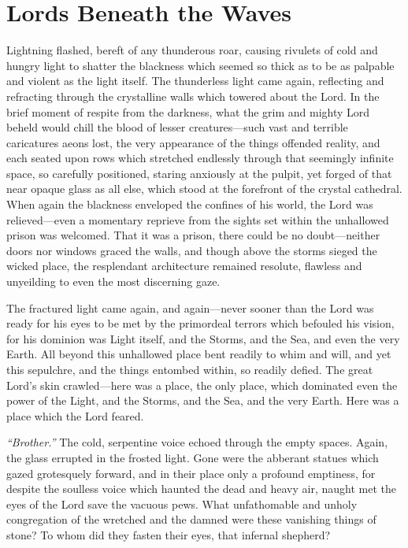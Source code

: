 \documentclass{report}
\begin{document}
\chapter*{Lords Beneath the Waves}

Lightning flashed, bereft of any thunderous roar, causing rivulets of cold and hungry light to shatter the blackness which seemed so thick as to be as palpable and violent as the light itself. The thunderless light came again, reflecting and refracting through the crystalline walls which towered about the Lord. In the brief moment of respite from the darkness, what the grim and mighty Lord beheld would chill the blood of lesser creatures—such vast and terrible caricatures aeons lost, the very appearance of the things offended reality, and each seated upon rows which stretched endlessly through that seemingly infinite space, so carefully positioned, staring anxiously at the pulpit, yet forged of that near opaque glass as all else, which stood at the forefront of the crystal cathedral. When again the blackness enveloped the confines of his world, the Lord was relieved—even a momentary reprieve from the sights set within the unhallowed prison was welcomed. That it was a prison, there could be no doubt—neither doors nor windows graced the walls, and though above the storms sieged the wicked place, the resplendant architecture remained resolute, flawless and unyeilding to even the most discerning gaze.

The fractured light came again, and again—never sooner than the Lord was ready for his eyes to be met by the primordeal terrors which befouled his vision, for his dominion was Light itself, and the Storms, and the Sea, and even the very Earth. All beyond this unhallowed place bent readily to whim and will, and yet this sepulchre, and the things entombed within, so readily defied. The great Lord's skin crawled—here was a place, the only place, which dominated even the power of the Light, and the Storms, and the Sea, and the very Earth. Here was a place which the Lord feared.

\textit{``Brother.''} The cold, serpentine voice echoed through the empty spaces. Again, the glass errupted in the frosted light. Gone were the abberant statues which gazed grotesquely forward, and in their place only a profound emptiness, for despite the soulless voice which haunted the dead and heavy air, naught met the eyes of the Lord save the vacuous pews. What unfathomable and unholy congregation of the wretched and the damned were these vanishing things of stone? To whom did they fasten their eyes, that infernal shepherd?
\end{document}
